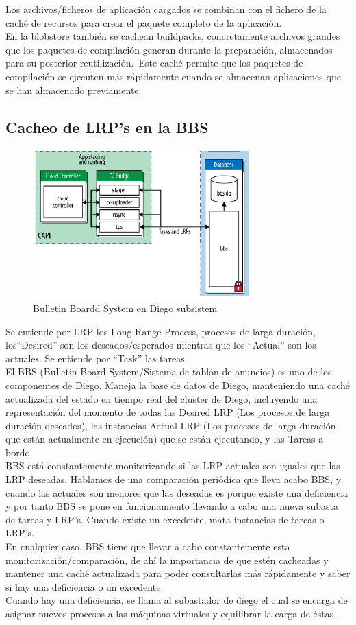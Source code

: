 \documentclass[a4paper,11pt]{article}
\begin{document}
Los archivos/ficheros de aplicación cargados se combinan con el fichero de la caché de recursos para crear el paquete completo de la aplicación.\\
En la blobstore también se cachean buildpacks, concretamente archivos grandes que los paquetes de compilación generan durante la preparación, almacenados para su posterior reutilización. Este caché permite que los paquetes de compilación se ejecuten más rápidamente cuando se almacenan aplicaciones que se han almacenado previamente.

\subsection{Cacheo de LRP's en la BBS}
\begin{figure}[h]
    \centering
    \includegraphics[width=0.75\textwidth]{fran2_1.png}
    \caption{Bulletin Boardd System en Diego subsistem}
    \label{fig:fran2_1}
\end{figure}
Se entiende por LRP los Long Range Process, procesos de larga duración, los``Desired'' son los deseados/esperados mientras que los ``Actual'' son los actuales.
Se entiende por ``Task'' las tareas.\\
El BBS (Bulletin Board System/Sistema de tablón de anuncios) es uno de los componentes de Diego. Maneja la base de datos de Diego, manteniendo una caché actualizada del estado en tiempo real del cluster de Diego, incluyendo una representación del momento de todas las Desired LRP (Los procesos de larga duración deseados), las instancias Actual LRP (Los procesos de larga duración que están actualmente en ejecución) que se están ejecutando, y las Tareas a bordo. \\
BBS está constantemente monitorizando si las LRP actuales son iguales que las LRP deseadas. Hablamos de una comparación periódica que lleva acabo BBS, y cuando las actuales son menores que las deseadas es porque existe una deficiencia y por tanto BBS se pone en funcionamiento llevando a cabo una nueva subasta de tareas y LRP’s. Cuando existe un excedente, mata instancias de tareas o LRP’s.\\
En cualquier caso, BBS tiene que llevar a cabo constantemente esta monitorización/comparación, de ahí la importancia de que estén cacheadas y mantener una caché actualizada para poder consultarlas más rápidamente y saber si hay una deficiencia o un excedente.\\
Cuando hay una deficiencia, se llama al subastador de diego el cual se encarga de asignar nuevos procesos a las máquinas virtuales y equilibrar la carga de éstas.
\end{document}
